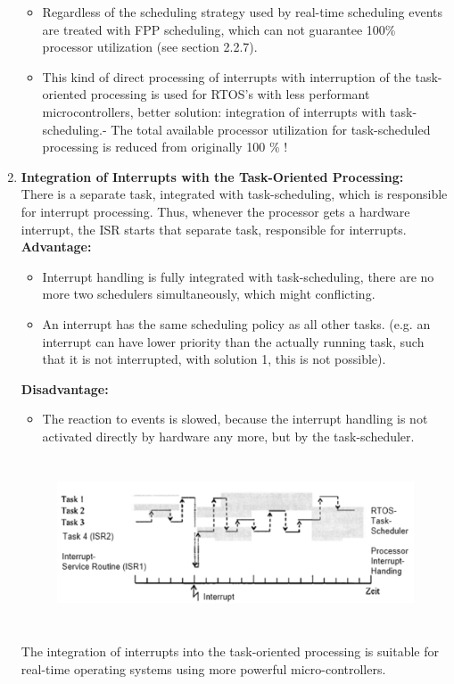 \begin{enumerate}
\begin{itemize}
\item Regardless of the scheduling strategy used by real-time scheduling events are treated with FPP scheduling, which can not guarantee 100\% processor utilization   (see section 2.2.7).

\item This kind of direct processing of interrupts with interruption of the task-oriented   processing is used for RTOS's with less performant microcontrollers,   better solution: integration of interrupts with task-scheduling.- The total available processor utilization for task-scheduled processing is reduced from originally 100 \% !
\end{itemize}
\os{\newpage}
\item {\rot\bf Integration of Interrupts with the Task-Oriented Processing: }\\

There is a separate task, integrated with task-scheduling, which is responsible for interrupt processing. Thus, whenever the processor gets a hardware interrupt, the ISR starts that separate task, responsible for interrupts.\\

\textbf{Advantage: }

\begin{itemize}
	\item Interrupt handling is fully integrated with task-scheduling,   there are no more two schedulers simultaneously, which might conflicting.
	\item An interrupt has the same scheduling policy as all other tasks.   (e.g. an interrupt can have lower priority than the actually running task, such that it   is not interrupted, with solution 1, this is not possible).
\end{itemize}  

\textbf{Disadvantage: } 

\begin{itemize}
	\item The reaction to events is slowed, because the interrupt handling is not activated   directly by hardware any more, but by the task-scheduler.
\end{itemize} 

 	\begin{figure}[h]
    \centering
    \includegraphics[width=14cm, height=5cm]{Images/image23.png}
    \label{fig:Fig 77}
    \end{figure}
\os{\newpage}
The integration of interrupts into the task-oriented processing is suitable for real-time operating systems using more powerful micro-controllers.
\end{enumerate}
\nsl{\newpage}

